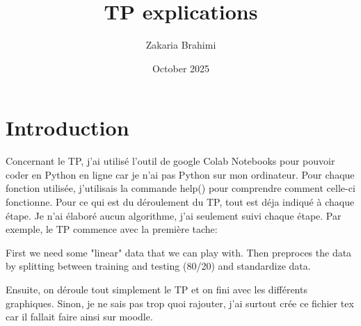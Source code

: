 \documentclass{article}
\title{TP explications}
\author{Zakaria Brahimi }
\date{October 2025}
\begin{document}
\maketitle

\section{Introduction}
Concernant le TP, j'ai utilisé l'outil de google Colab Notebooks pour pouvoir coder en Python en ligne car je n'ai pas Python sur mon ordinateur. Pour chaque fonction utilisée, j'utilisais la commande help() pour comprendre comment celle-ci fonctionne. Pour ce qui est du déroulement du TP, tout est déja indiqué à chaque étape. Je n'ai élaboré aucun algorithme, j'ai seulement suivi chaque étape.
Par exemple, le TP commence avec la première tache: \begin{it}
    First we need some "linear" data that we can play with. Then preproces the data by splitting between training and testing (80/20) and standardize data.
\end{it}
Ensuite, on déroule tout simplement le TP et on fini avec les différents graphiques. Sinon, je ne sais pas trop quoi rajouter, j'ai surtout crée ce fichier tex car il fallait faire ainsi sur moodle.
\end{document}
